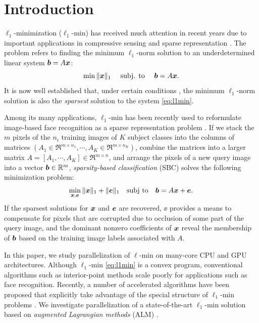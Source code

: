\documentclass[preprint]{sigplanconf}
\begin{document}
\section{Introduction} 
\vspace{-0.06in}
$\ell_1$-minimization ($\ell_1$-min) has received much attention in recent
years due to important applications in compressive sensing
\cite{BrucksteinA2007} and sparse representation \cite{WrightJ2010-PIEEE}.  
The problem refers to finding the minimum $\ell_1$-norm solution to an
underdetermined linear system ${\boldsymbol{b}}=A{\boldsymbol{x}}$:
\begin{equation}
\min \|{\boldsymbol{x}}\|_1\quad \mbox{ subj. to }\quad {\boldsymbol{b}} = A{\boldsymbol{x}}.
\label{eq:l1min}
\end{equation}
It is now well established that, under certain conditions
\cite{CandesE2005-IT_1,DonohoD2004}, the minimum $\ell_1$-norm solution is also
the \emph{sparsest} solution to the system \eqref{eq:l1min}.

Among its many applications, $\ell_1$-min has been recently used to reformulate
image-based face recognition as a sparse representation problem
\cite{WrightJ2009-PAMI}.  If we stack the $m$ pixels of the $n_i$ training images of $K$ subject
classes into the columns of matrices $(A_1\in\Re^{m\times n_1}, \cdots, A_K\in\Re^{m\times n_K})$, combine
the matrices into a larger matrix $A = [A_1, \cdots, A_K]\in\Re^{m\times n}$, and arrange the pixels of a new
query image into a vector ${\boldsymbol{b}}\in{\mathbb{R}}^m$, \emph{sparsity-based
classification} (SBC) solves the following minimization problem:
\begin{equation}
\min_{{\boldsymbol{x}}, {\boldsymbol{e}}} \| {\boldsymbol{x}} \|_1 + \|{\boldsymbol{e}}\|_1 \quad \textup{subj to} \quad {\boldsymbol{b}} = A {\boldsymbol{x}} + {\boldsymbol{e}}.
\label{eq:l1min_denoise}
\end{equation}
If the sparsest solutions for ${\boldsymbol{x}}$ and $\boldsymbol{e}$ are recovered, $\ee$ provides a
means to compensate for pixels that are corrupted due to occlusion of some part of the query
image, and the dominant nonzero coefficients of ${\boldsymbol{x}}$ reveal the membership of
${\boldsymbol{b}}$ based on the training image labels associated with $A$. 

In this paper, we study parallelization of $\ell$-min on many-core CPU and GPU
architectures. Although $\ell_1$-min \eqref{eq:l1min} is a convex
program, conventional algorithms such as interior-point methods
\cite{ChenS2001-SIAM,TibshiraniR1996} scale poorly
for applications such as face recognition. Recently, a number of
accelerated algorithms have been proposed that explicitly take advantage of
the special structure of $\ell_1$-min problems
\cite{LorisI2009,YangA2010-ICIP}. We investigate parallelization of a
state-of-the-art $\ell_1$-min solution based on
\emph{augmented Lagrangian methods} (ALM) \cite{BertsekasD2003,YangA2010-ICIP}.
\end{document}
